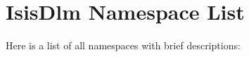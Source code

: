 \section{Isis\-Dlm Namespace List}
Here is a list of all namespaces with brief descriptions:\begin{CompactList}
\item{}
\item{}
\end{CompactList}
